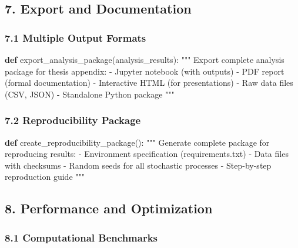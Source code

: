 \documentclass[
  11pt,
  letterpaper,
]{book}
\newenvironment{Shaded}{\begin{snugshade}}{\end{snugshade}}
\newcommand{\CommentTok}[1]{\textcolor[rgb]{0.37,0.37,0.37}{#1}}
\newcommand{\KeywordTok}[1]{\textcolor[rgb]{0.00,0.23,0.31}{\textbf{#1}}}
\newcommand{\NormalTok}[1]{\textcolor[rgb]{0.00,0.23,0.31}{#1}}
\begin{document}
\subsection{7. Export and Documentation}\label{export-and-documentation}

\subsubsection{7.1 Multiple Output
Formats}\label{multiple-output-formats}

\begin{Shaded}
\begin{Highlighting}[]
\KeywordTok{def}\NormalTok{ export\_analysis\_package(analysis\_results):}
    \CommentTok{"""}
\CommentTok{    Export complete analysis package for thesis appendix:}
\CommentTok{    {-} Jupyter notebook (with outputs)}
\CommentTok{    {-} PDF report (formal documentation)}
\CommentTok{    {-} Interactive HTML (for presentations)}
\CommentTok{    {-} Raw data files (CSV, JSON)}
\CommentTok{    {-} Standalone Python package}
\CommentTok{    """}
\end{Highlighting}
\end{Shaded}

\subsubsection{7.2 Reproducibility
Package}\label{reproducibility-package}

\begin{Shaded}
\begin{Highlighting}[]
\KeywordTok{def}\NormalTok{ create\_reproducibility\_package():}
    \CommentTok{"""}
\CommentTok{    Generate complete package for reproducing results:}
\CommentTok{    {-} Environment specification (requirements.txt)}
\CommentTok{    {-} Data files with checksums}
\CommentTok{    {-} Random seeds for all stochastic processes}
\CommentTok{    {-} Step{-}by{-}step reproduction guide}
\CommentTok{    """}
\end{Highlighting}
\end{Shaded}

\subsection{8. Performance and
Optimization}\label{performance-and-optimization}

\subsubsection{8.1 Computational
Benchmarks}\label{computational-benchmarks}
\end{document}
